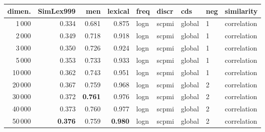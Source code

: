 \begin{tabular}{rrrrlllll}
\toprule
 dimen. &  SimLex999 &    men &  lexical &  freq &  discr &     cds & neg &   similarity \\
\midrule
           1\,000 &      0.334 &  0.681 &    0.875 &  logn &  scpmi &  global &   1 &  correlation \\
           2\,000 &      0.349 &  0.718 &    0.918 &  logn &  scpmi &  global &   1 &  correlation \\
           3\,000 &      0.350 &  0.726 &    0.924 &  logn &  scpmi &  global &   1 &  correlation \\
           5\,000 &      0.353 &  0.733 &    0.933 &  logn &  scpmi &  global &   1 &  correlation \\
          10\,000 &      0.362 &  0.743 &    0.951 &  logn &  scpmi &  global &   1 &  correlation \\
          20\,000 &      0.367 &  0.759 &    0.968 &  logn &  scpmi &  global &   2 &  correlation \\
          30\,000 &      0.372 &  \textbf{0.761} &    0.976 &  logn &  scpmi &  global &   2 &  correlation \\
          40\,000 &      0.373 &  0.760 &    0.977 &  logn &  scpmi &  global &   2 &  correlation \\
          50\,000 &      \textbf{0.376} &  0.759 &    \textbf{0.980} &  logn &  scpmi &  global &   2 &  correlation \\
\bottomrule
\end{tabular}
